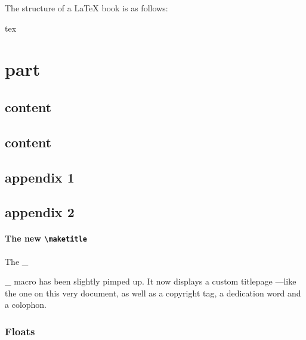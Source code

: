 The structure of a \LaTeX{} book is as follows:
\begin{codebox}{tex}


\maketitle %

\frontmatter %
\chapter{}
\tableofcontents

\mainmatter %
\part{part}
\chapter{content}
\chapter{content}

\appendix %
\chapter{appendix 1}
\chapter{appendix 2}

\backmatter %
\printbibliography
\printindex


\end{codebox}

\subsection{The new \texttt{\textbackslash maketitle}}

The _\maketitle_ macro has been slightly pimped up. It now displays a custom titlepage ---like the one on this very document, as well as a copyright tag, a dedication word and a colophon.

\section{Floats}
\label{chp:floats}

